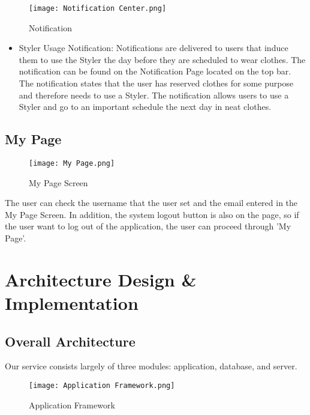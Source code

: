 \documentclass[conference]{IEEEtran}
\begin{document}
\begin{figure}[htbp]
\centerline{\texttt{[image: Notification Center.png]}}
\label{fig}
\caption{Notification}
\end{figure}
\begin{itemize}
    \item Styler Usage Notification: Notifications are delivered to users that induce them to use the Styler the day before they are scheduled to wear clothes. The notification can be found on the Notification Page located on the top bar. The notification states that the user has reserved clothes for some purpose and therefore needs to use a Styler. The notification allows users to use a Styler and go to an important schedule the next day in neat clothes.\\
\end{itemize}

\newpage
\subsection{My Page}
\begin{figure}[htbp]
\centerline{\texttt{[image: My Page.png]}}
\label{fig}
\caption{My Page Screen}
\end{figure}
The user can check the username that the user set and the email entered in the My Page Screen. In addition, the system logout button is also on the page, so if the user want to log out of the application, the user can proceed through 'My Page'.\\


\section{Architecture Design & Implementation}
\subsection{Overall Architecture}
Our service consists largely of three modules: application, database, and server.
\begin{figure}[htbp]
\centerline{\texttt{[image: Application Framework.png]}}
\label{fig}
\caption{Application Framework}
\end{figure}
\end{document}
